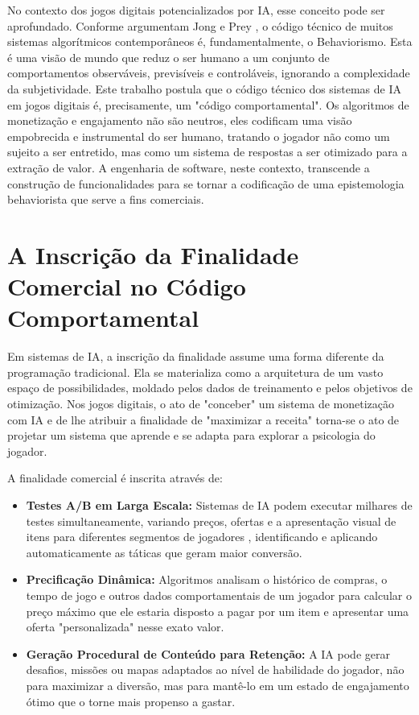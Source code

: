 No contexto dos jogos digitais potencializados por IA, esse conceito pode ser aprofundado. Conforme argumentam Jong e Prey \cite{deJongPrey2022}, o código 
técnico de muitos sistemas algorítmicos contemporâneos é, fundamentalmente, o Behaviorismo. Esta é uma visão de mundo que reduz o ser 
humano a um conjunto de comportamentos observáveis, previsíveis e controláveis, ignorando a complexidade da subjetividade. Este 
trabalho postula que o código técnico dos sistemas de IA em jogos digitais é, precisamente, um "código comportamental". Os algoritmos 
de monetização e engajamento não são neutros, eles codificam uma visão empobrecida e instrumental do ser humano, tratando o jogador 
não como um sujeito a ser entretido, mas como um sistema de respostas a ser otimizado para a extração de valor. A engenharia de 
software, neste contexto, transcende a construção de funcionalidades para se tornar a codificação de uma epistemologia behaviorista 
que serve a fins comerciais.

\section{A Inscrição da Finalidade Comercial no Código Comportamental}\label{sec:inscricao_finalidade}

Em sistemas de IA, a inscrição da finalidade assume uma forma diferente da programação tradicional. Ela se materializa como a 
arquitetura de um vasto espaço de possibilidades, moldado pelos dados de treinamento e pelos objetivos de otimização. Nos jogos 
digitais, o ato de "conceber" um sistema de monetização com IA e de lhe atribuir a finalidade de "maximizar a receita" torna-se o ato 
de projetar um sistema que aprende e se adapta para explorar a psicologia do jogador.

A finalidade comercial é inscrita através de:

\begin{itemize}
    \item \textbf{Testes A/B em Larga Escala:} Sistemas de IA podem executar milhares de testes simultaneamente, variando preços, ofertas e a 
    apresentação visual de itens para diferentes segmentos de jogadores \cite{Lupianez-Villanueva2022}, identificando e aplicando automaticamente as táticas que 
    geram maior conversão. 
    
    \item \textbf{Precificação Dinâmica:} Algoritmos analisam o histórico de compras, o tempo de jogo e outros dados comportamentais de um 
    jogador para calcular o preço máximo que ele estaria disposto a pagar por um item e apresentar uma oferta "personalizada" nesse 
    exato valor.
    
    \item \textbf{Geração Procedural de Conteúdo para Retenção:} A IA pode gerar desafios, missões ou mapas adaptados ao nível de habilidade 
    do jogador, não para maximizar a diversão, mas para mantê-lo em um estado de engajamento ótimo que o torne mais propenso a gastar.
\end{itemize}

